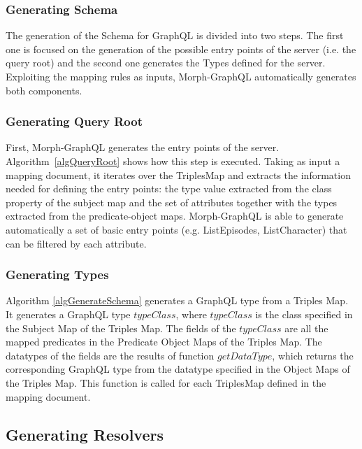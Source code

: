 \subsubsection{Generating Schema}
The generation of the Schema for GraphQL is divided into two steps. The first one is focused on the generation of the possible entry points of the server (i.e. the query root) and the second one generates the Types defined for the server. Exploiting the mapping rules as inputs, Morph-GraphQL automatically generates both components.

\subsubsection{Generating Query Root}
First, Morph-GraphQL generates the entry points of the server. Algorithm~\ref{algQueryRoot} shows how this step is executed. Taking as input a mapping document, it iterates over the TriplesMap and extracts the information needed for defining the entry points: the type value extracted from the class property of the subject map and the set of attributes together with the types extracted from the predicate-object maps. Morph-GraphQL is able to generate automatically a set of basic entry points (e.g. ListEpisodes, ListCharacter) that can be filtered by each attribute.


\subsubsection{Generating Types}
Algorithm \ref{algGenerateSchema} generates a GraphQL type from a Triples Map. It generates a GraphQL type $typeClass$, where $typeClass$ is the class specified in the Subject Map of the Triples Map. The fields of the $typeClass$ are all the mapped predicates in the Predicate Object Maps of the Triples Map. The datatypes of the fields are the results of function $getDataType$, which returns the corresponding GraphQL type from the datatype specified in the Object Maps of the Triples Map. This function is called for each TriplesMap defined in the mapping document.




\subsection{Generating Resolvers}
%



